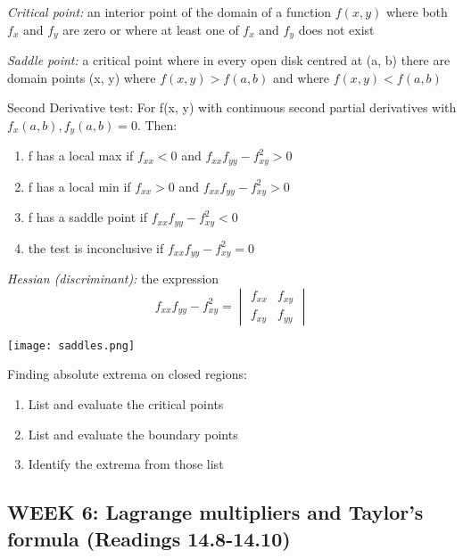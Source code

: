 \documentclass[12pt]{article}
\begin{document}
\emph{Critical point:} an interior point of the domain of a function $f(x, y)$ where both $f_x$ and $f_y$ are zero or where at least one of $f_x$ and $f_y$ does not exist

\emph{Saddle point:} a critical point where in every open disk centred at (a, b) there are domain points (x, y) where $f(x,y) > f(a,b)$ and where $f(x,y) < f(a,b)$

Second Derivative test:
For f(x, y) with continuous second partial derivatives with $f_x(a, b), f_y(a, b) = 0$. Then:
\begin{enumerate}
    \item f has a local max if $f_{xx} < 0$ and $f_{xx} f_{yy} - f_{xy}^2 > 0$
    \item f has a local min if $f_{xx} > 0$ and $f_{xx} f_{yy} - f_{xy}^2 > 0$
    \item f has a saddle point if $f_{xx} f_{yy} - f_{xy}^2 < 0$
    \item the test is inconclusive if $f_{xx} f_{yy} - f_{xy}^2 = 0$
\end{enumerate}

\emph{Hessian (discriminant):} the expression
\[ f_{xx} f_{yy} - f_{xy}^2 = \begin{vmatrix}
    f_{xx} & f_{xy}\\
    f_{xy} & f_{yy} 
\end{vmatrix}\]

\begin{center}
    \texttt{[image: saddles.png]}
\end{center}

Finding absolute extrema on closed regions:
\begin{enumerate}
    \item List and evaluate the critical points
    \item List and evaluate the boundary points
    \item Identify the extrema from those list
\end{enumerate}
\subsection{WEEK 6: Lagrange multipliers and Taylor's formula (Readings 14.8-14.10)}

\pagebreak
\end{document}
